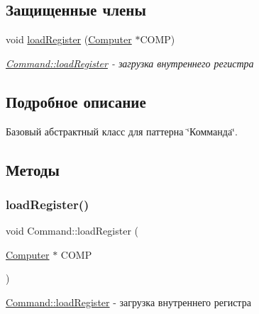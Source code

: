 \subsection*{Защищенные члены}
\begin{DoxyCompactItemize}
\item 
void \hyperlink{class_command_aac6f368e7c9dbb357b3f00627d5dabfc}{load\+Register} (\hyperlink{class_computer}{Computer} $\ast$C\+O\+MP)
\begin{DoxyCompactList}\small\item\em \hyperlink{class_command_aac6f368e7c9dbb357b3f00627d5dabfc}{Command\+::load\+Register} -\/ загрузка внутреннего регистра \end{DoxyCompactList}\end{DoxyCompactItemize}


\subsection{Подробное описание}
Базовый абстрактный класс для паттерна \char`\"{}Комманда\char`\"{}. 

\subsection{Методы}
\hypertarget{class_command_aac6f368e7c9dbb357b3f00627d5dabfc}{}\label{class_command_aac6f368e7c9dbb357b3f00627d5dabfc} 
\subsubsection{\texorpdfstring{load\+Register()}{loadRegister()}}
{\footnotesize\ttfamily void Command\+::load\+Register (\begin{DoxyParamCaption}\item[{\hyperlink{class_computer}{Computer} $\ast$}]{C\+O\+MP }\end{DoxyParamCaption})\hspace{0.3cm}{\ttfamily [protected]}}



\hyperlink{class_command_aac6f368e7c9dbb357b3f00627d5dabfc}{Command\+::load\+Register} -\/ загрузка внутреннего регистра 


